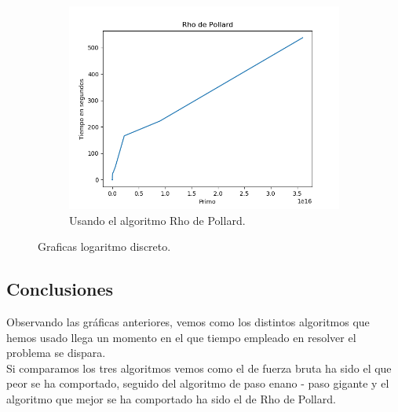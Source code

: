 \documentclass[12pt,spanish]{article}
\begin{document}
\begin{figure}[!htbp]
\begin{subfigure}{.5\textwidth}
				\includegraphics[width=.8\linewidth]{log_ro}
				\caption{Usando el algoritmo Rho de Pollard.}
				\label{fig:sfig13}
			\end{subfigure}
		\caption{Graficas logaritmo discreto.}
		\label{fig:fig1}
		\end{figure}
	\subsection{Conclusiones}
	Observando las gráficas anteriores, vemos como los distintos algoritmos que hemos usado llega un momento en el que tiempo empleado en resolver el problema se dispara.\\
	Si comparamos los tres algoritmos vemos como el de fuerza bruta ha sido el que peor se ha comportado, seguido del algoritmo de paso enano - paso gigante y el algoritmo que mejor se ha comportado ha sido el de Rho de Pollard.\\
	
\end{document}
